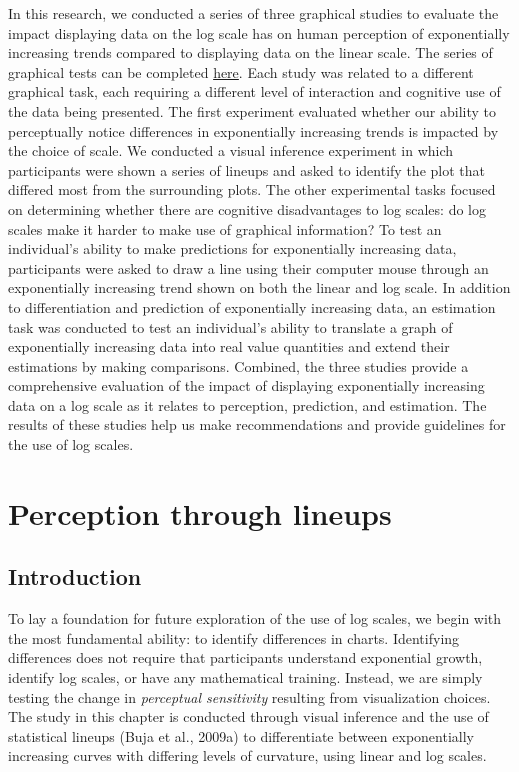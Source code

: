 \documentclass[print]{nuthesis}
\begin{document}
In this research, we conducted a series of three graphical studies to evaluate the impact displaying data on the log scale has on human perception of exponentially increasing trends compared to displaying data on the linear scale.
The series of graphical tests can be completed \href{https://shiny.srvanderplas.com/perception-of-statistical-graphics/}{here}.
Each study was related to a different graphical task, each requiring a different level of interaction and cognitive use of the data being presented.
The first experiment evaluated whether our ability to perceptually notice differences in exponentially increasing trends is impacted by the choice of scale.
We conducted a visual inference experiment in which participants were shown a series of lineups and asked to identify the plot that differed most from the surrounding plots.
The other experimental tasks focused on determining whether there are cognitive disadvantages to log scales: do log scales make it harder to make use of graphical information?
To test an individual's ability to make predictions for exponentially increasing data, participants were asked to draw a line using their computer mouse through an exponentially increasing trend shown on both the linear and log scale.
In addition to differentiation and prediction of exponentially increasing data, an estimation task was conducted to test an individual's ability to translate a graph of exponentially increasing data into real value quantities and extend their estimations by making comparisons.
Combined, the three studies provide a comprehensive evaluation of the impact of displaying exponentially increasing data on a log scale as it relates to perception, prediction, and estimation.
The results of these studies help us make recommendations and provide guidelines for the use of log scales.

\hypertarget{lineups}{%
\chapter{Perception through lineups}\label{lineups}}

\hypertarget{introduction}{%
\section{Introduction}\label{introduction}}

To lay a foundation for future exploration of the use of log scales, we begin with the most fundamental ability: to identify differences in charts. Identifying differences does not require that participants understand exponential growth, identify log scales, or have any mathematical training.
Instead, we are simply testing the change in \emph{perceptual sensitivity} resulting from visualization choices.
The study in this chapter is conducted through visual inference and the use of statistical lineups (Buja et al., 2009a) to differentiate between exponentially increasing curves with differing levels of curvature, using linear and log scales.
\end{document}
